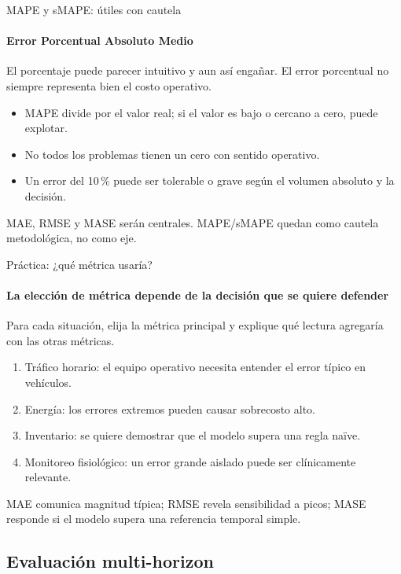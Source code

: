 \documentclass[aspectratio=169,11pt]{beamer}  %
\newcommand{\Lg}{\fontsize{16}{20}\selectfont}
\newcommand{\bigstate}[1]{\begin{center}\Lg #1\end{center}}
\begin{document}
\begin{frame}{MAPE y sMAPE: útiles con cautela}
\framesubtitle{Error Porcentual Absoluto Medio}
\bigstate{El porcentaje puede parecer intuitivo y aun así engañar. El error porcentual no siempre representa bien el costo operativo.}
\begin{itemize}\small
\item MAPE divide por el valor real; si el valor es bajo o cercano a cero, puede explotar.
\item No todos los problemas tienen un cero con sentido operativo.
\item Un error del 10\,\% puede ser tolerable o grave según el volumen absoluto y la decisión.
\end{itemize}
\begin{rulebox}
MAE, RMSE y MASE serán centrales. MAPE/sMAPE quedan como cautela metodológica, no como eje.
\end{rulebox}
\end{frame}

\begin{frame}{Práctica: ¿qué métrica usaría?}
\framesubtitle{La elección de métrica depende de la decisión que se quiere defender}
\begin{taskbox}
Para cada situación, elija la métrica principal y explique qué lectura agregaría con las otras métricas.
\end{taskbox}
\begin{enumerate}
\item Tráfico horario: el equipo operativo necesita entender el error típico en vehículos.
\item Energía: los errores extremos pueden causar sobrecosto alto.
\item Inventario: se quiere demostrar que el modelo supera una regla naïve.
\item Monitoreo fisiológico: un error grande aislado puede ser clínicamente relevante.
\end{enumerate}
\begin{goldbox}
MAE comunica magnitud típica; RMSE revela sensibilidad a picos; MASE responde si el modelo supera una referencia temporal simple.
\end{goldbox}
\end{frame}

\subsection{Evaluación multi-horizon}
\end{document}
